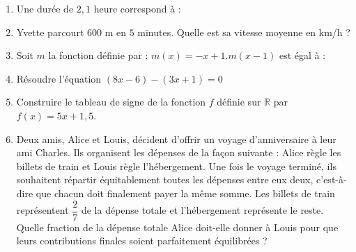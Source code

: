 \documentclass[a4paper,11pt]{article}
\begin{document}
\newpage

\begin{seanceD}{} %
\begin{enumerate}
\item  Une durée de $2{,}1$ heure correspond à :  \dotfill


\item  Yvette parcourt $600\text{ m}$ en $5$ minutes. Quelle est sa vitesse moyenne en km/h ? \dotfill

\dotfill


\item  Soit $m$ la fonction définie par : $m(x)=-x+1$.$m(x-1)$ est égal à :  

\dotfill


\item  Résoudre l'équation $(8x-6)-(3x+1)=0$ \dotfill

\dotfill



\item  Construire le tableau de signe de la fonction $f$ définie sur $\mathbb{R}$ par $f(x) = 5x+1,5$.

\vspace*{4cm}

\item 
 Deux amis, Alice et Louis, décident d'offrir un voyage d'anniversaire à leur ami Charles. 
    Ils organisent les dépenses de la façon suivante : Alice règle les billets de train et
Louis règle l'hébergement. Une fois le voyage terminé, ils souhaitent répartir équitablement toutes les dépenses entre eux deux, c'est-à-dire que chacun doit finalement payer la même somme.
Les billets de train représentent $\dfrac{2}{7}$ de la dépense totale et l'hébergement représente le reste.
Quelle fraction de la dépense totale Alice doit-elle donner à Louis pour que leurs contributions finales soient parfaitement équilibrées ?

\dotfill

\dotfill
\end{enumerate}
\end{seanceD}

\newpage

\end{document}
